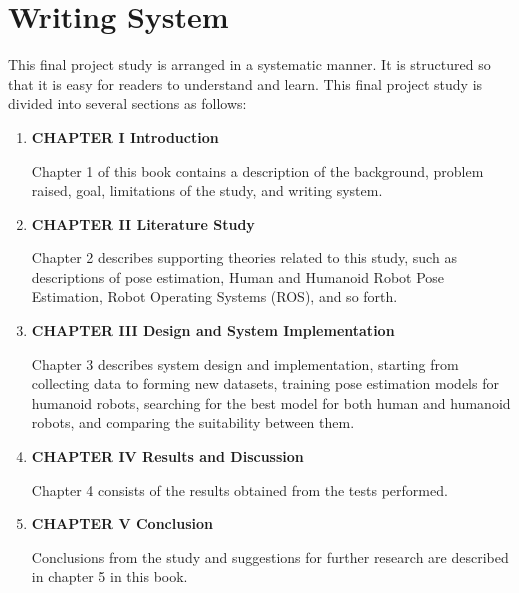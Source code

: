 \section{Writing System}
\label{sec:writingsystem}

This final project study is arranged in a systematic manner.
It is structured so that it is easy for readers to understand and learn.
This final project study is divided into several sections as follows:

\begin{enumerate}[nolistsep]

  \item \textbf{CHAPTER I Introduction}

        Chapter 1 of this book contains a description of the background, problem raised, goal, limitations of the study, and writing system.

        \vspace{2ex}

  \item \textbf{CHAPTER II Literature Study}

        Chapter 2 describes supporting theories related to this study, such as descriptions of pose estimation, Human and Humanoid Robot Pose Estimation, Robot Operating Systems (ROS), and so forth.

        \vspace{2ex}

  \item \textbf{CHAPTER III Design and System Implementation}

        Chapter 3 describes system design and implementation, starting from collecting data to forming new datasets, training pose estimation models for humanoid robots,
        searching for the best model for both human and humanoid robots, and comparing the suitability between them.

        \vspace{2ex}

  \item \textbf{CHAPTER IV Results and Discussion}

        Chapter 4 consists of the results obtained from the tests performed. 

        \vspace{2ex}

  \item \textbf{CHAPTER V Conclusion}

        Conclusions from the study and suggestions for further research are described in chapter 5 in this book.

\end{enumerate}
